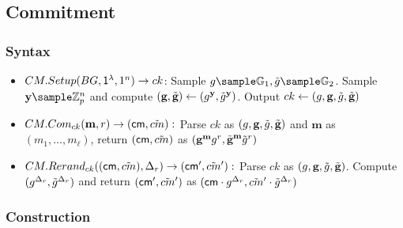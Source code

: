 \newcommand{\vt}{\mathsf{vt}}
\newcommand{\wx}{\mathsf{wx}}
\newcommand{\wxone}{\mathsf{w_1x}}
\newcommand{\wxtwo}{\mathsf{w_2x}}
\newcommand{\wxhat}{\mathsf{\hat{w}x}}

\newcommand{\acu}{\mathsf{ACU}}
\newcommand{\acusetup}{\mathsf{ACU.Setup}}
\newcommand{\acuadd}{\mathsf{ACU.Add}}
\newcommand{\acudel}{\mathsf{ACU.Del}}
\newcommand{\acuvermem}{\mathsf{ACU.VerMem}}
\newcommand{\acuvernonmem}{\mathsf{ACU.VerNonMem}}


\newcommand{\rev}{\mathsf{REV}}
\newcommand{\revsetup}{\mathsf{REV.Setup}}
\newcommand{\revrevoke}{\mathsf{REV.Revoke}}
\newcommand{\revtokengen}{\mathsf{REV.TokenGen}}
\newcommand{\revtokenver}{\mathsf{REV.TokenVer}}

\newcommand{\rt}{\mathsf{rt}}

\newcommand{\tilcm}{\tilde{cm}}


\newcommand{\mb}{\textbf{m}}
\newcommand{\gb}{\textbf{g}}
\newcommand{\tilgb}{\tilde{\textbf{g}}}
\newcommand{\yb}{\textbf{y}}
\newcommand{\rd}{\Delta_r}
\newcommand{\td}{\Delta_t}
\newcommand{\ud}{\Delta_u}


\subsection{Commitment}
\subsubsection{Syntax}
\begin{itemize}
    \item $CM.Setup(BG, \mathsf{1^{\lambda}}, 1^n) \to ck$: Sample $g \sample \G_1, \tilg \sample \G_2$. Sample $\yb \sample \Z_p^{n}$ and compute $(\gb, \tilgb) \gets (g^{\yb}, \tilg^{\yb})$. Output $ck \gets (g, \gb, \tilg, \tilgb)$
    
    \item $CM.Com_{ck}(\mb, r) \to (\cm, \tilcm):$ Parse $ck$ as $(g, \gb, \tilg, \tilgb)$ and $\mb$ as $(m_1, \dots, m_{\ell})$, return $(\cm, \tilcm)$ as $(\gb^{\mb}g^r, \tilgb^{\mb}\tilg^r)$

    \item $CM.Rerand_{ck}((\cm, \tilcm), \rd) \to (\cm', \tilcm'):$ Parse $ck$ as $(g, \gb, \tilg, \tilgb)$. Compute $(g^{\rd}, \tilg^{\rd})$ and return $(\cm', \tilcm')$ as $(\cm \cdot g^{\rd}, \tilcm' \cdot \tilg^{\rd})$
\end{itemize}

\subsubsection{Construction}

